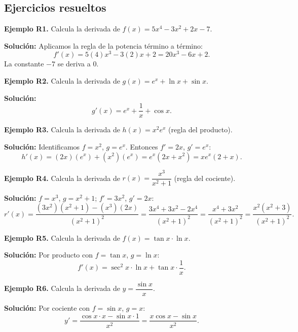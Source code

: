 \documentclass[12pt, letterpaper]{article}
\begin{document}
\newpage

\subsection{Ejercicios resueltos}

\textbf{Ejemplo R1.} Calcula la derivada de $f(x) = 5x^4 - 3x^2 + 2x - 7$.

\begin{cuadrosolucion}
  \textbf{Solución:} Aplicamos la regla de la potencia término a término:
  $$f'(x) = 5(4)x^3 - 3(2)x + 2 = 20x^3 - 6x + 2.$$
  La constante $-7$ se deriva a $0$.
\end{cuadrosolucion}

\textbf{Ejemplo R2.} Calcula la derivada de $g(x) = e^x + \ln x + \sin x$.

\begin{cuadrosolucion}
  \textbf{Solución:}
  $$g'(x) = e^x + \frac{1}{x} + \cos x.$$
\end{cuadrosolucion}

\textbf{Ejemplo R3.} Calcula la derivada de $h(x) = x^2 e^x$ (regla del producto).

\begin{cuadrosolucion}
  \textbf{Solución:} Identificamos $f = x^2$, $g = e^x$. Entonces $f' = 2x$, $g' = e^x$:
  $$h'(x) = (2x)(e^x) + (x^2)(e^x) = e^x(2x + x^2) = x e^x (2 + x).$$
\end{cuadrosolucion}

\textbf{Ejemplo R4.} Calcula la derivada de $r(x) = \dfrac{x^3}{x^2 + 1}$ (regla del cociente).

\begin{cuadrosolucion}
  \textbf{Solución:} $f = x^3$, $g = x^2 + 1$; $f' = 3x^2$, $g' = 2x$:
  $$r'(x) = \frac{(3x^2)(x^2 + 1) - (x^3)(2x)}{(x^2 + 1)^2} = \frac{3x^4 + 3x^2 - 2x^4}{(x^2 + 1)^2} = \frac{x^4 + 3x^2}{(x^2 + 1)^2} = \frac{x^2(x^2 + 3)}{(x^2 + 1)^2}.$$
\end{cuadrosolucion}

\textbf{Ejemplo R5.} Calcula la derivada de $f(x) = \tan x \cdot \ln x$.

\begin{cuadrosolucion}
  \textbf{Solución:} Por producto con $f = \tan x$, $g = \ln x$:
  $$f'(x) = \sec^2 x \cdot \ln x + \tan x \cdot \frac{1}{x}.$$
\end{cuadrosolucion}

\textbf{Ejemplo R6.} Calcula la derivada de $y = \dfrac{\sin x}{x}$.

\begin{cuadrosolucion}
  \textbf{Solución:} Por cociente con $f = \sin x$, $g = x$:
  $$y' = \frac{\cos x \cdot x - \sin x \cdot 1}{x^2} = \frac{x \cos x - \sin x}{x^2}.$$
\end{cuadrosolucion}
\end{document}
